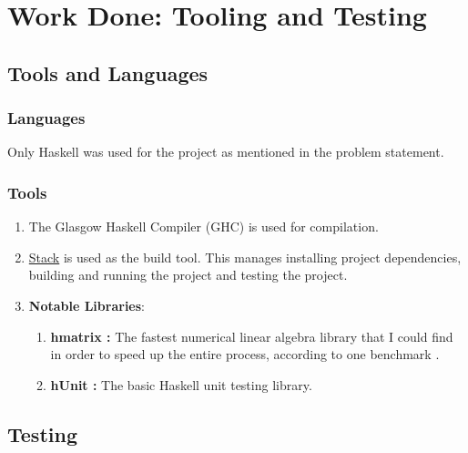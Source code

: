 \documentclass[12pt]{scrreprt}
\begin{document}
\chapter{Work Done: Tooling and Testing}

\section {Tools and Languages}


\subsection{Languages}

Only Haskell was used for the project as mentioned in the problem statement.

\subsection{Tools}

\begin{enumerate}
    \item The Glasgow Haskell Compiler (GHC) is used for compilation.
    \item \href{https://docs.haskellstack.org/en/stable/}{Stack} is used as the build tool. This manages installing project dependencies, building and running the project and testing the project.
    
    \item \textbf{Notable Libraries}:
    \begin{enumerate}
        \item \textbf{hmatrix : } The fastest numerical linear algebra library that I could find in order to speed up the entire process, according to one benchmark \cite{matrixbench}. 
        \item \textbf{hUnit : } The basic Haskell unit testing library.
    \end{enumerate} 
\end{enumerate}






\section{Testing}
\end{document}
